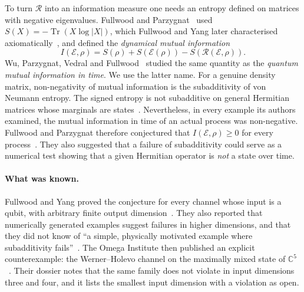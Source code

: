 \documentclass[11pt,a4paper]{article}
\theoremstyle{definition}\newtheorem{definition}[theorem]{Definition}
\theoremstyle{remark}\newtheorem{remark}[theorem]{Remark}
\newcommand{\Tr}{\operatorname{Tr}}
\newcommand{\E}{\mathcal E}
\newcommand{\R}{\mathcal R}
\begin{document}
To turn $\R$ into an information measure one needs an entropy defined on matrices with negative eigenvalues. Fullwood and Parzygnat~\cite{FP} used $S(X)=-\Tr(X\log|X|)$, which Fullwood and Yang later characterised axiomatically~\cite{FY}, and defined the \emph{dynamical mutual information}
\[
 I(\E,\rho)=S(\rho)+S(\E(\rho))-S(\R(\E,\rho)).
\]
Wu, Parzygnat, Vedral and Fullwood~\cite{WPVF} studied the same quantity as the \emph{quantum mutual information in time}. We use the latter name. For a genuine density matrix, non-negativity of mutual information is the subadditivity of von Neumann entropy. The signed entropy is not subadditive on general Hermitian matrices whose marginals are states~\cite[Remark~1]{FP}. Nevertheless, in every example its authors examined, the mutual information in time of an actual process was non-negative. Fullwood and Parzygnat therefore conjectured that $I(\E,\rho)\ge0$ for every process~\cite[Remark~1 and Section~5]{FP}. They also suggested that a failure of subadditivity could serve as a numerical test showing that a given Hermitian operator is \emph{not} a state over time.

\paragraph{What was known.} Fullwood and Yang proved the conjecture for every channel whose input is a qubit, with arbitrary finite output dimension~\cite[Theorem~4.1]{FY}. They also reported that numerically generated examples suggest failures in higher dimensions, and that they did not know of ``a simple, physically motivated example where subadditivity fails''~\cite[Section~6]{FY}. The Omega Institute then published an explicit counterexample: the Werner--Holevo channel on the maximally mixed state of $\mathbb C^5$~\cite{Omega}. Their dossier notes that the same family does not violate in input dimensions three and four, and it lists the smallest input dimension with a violation as open.
\end{document}
